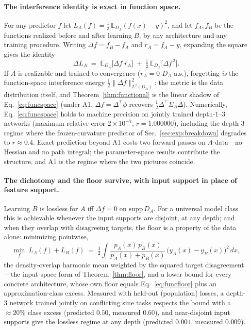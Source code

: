 \documentclass[10pt,a4paper]{article}
\theoremstyle{plain}
\theoremstyle{definition}
\newcommand{\Sig}{\Sigma}
\newcommand{\Del}{\Delta}
\begin{document}
\paragraph{The interference identity is exact in function space.} For any predictor $f$
let $L_A(f)=\tfrac12\,\mathbb{E}_{D_A}(f(x)-y)^2$, and let $f_A,f_B$ be the functions
realized before and after learning $B$, by any architecture and any training procedure.
Writing $\Delta\!f=f_B-f_A$ and $r_A=f_A-y$, expanding the square gives the identity
\begin{equation}
\Delta L_A\;=\;\mathbb{E}_{D_A}\!\big[\Delta\!f\;r_A\big]\;+\;\tfrac12\,
\mathbb{E}_{D_A}\!\big[\Delta\!f^{\,2}\big].
\label{eq:funcspace}
\end{equation}
If $A$ is realizable and trained to convergence ($r_A=0$ $D_A$-a.s.), forgetting \emph{is}
the function-space interference energy $\tfrac12\|\Delta\!f\|^2_{L^2(D_A)}$: the metric is
the data distribution itself, and Theorem~\ref{thm:functional} is the linear shadow of
Eq.~\eqref{eq:funcspace} (under A1, $\Delta\!f=\Del^\top\phi$ recovers
$\tfrac12\Del^\top\Sig_A\Del$). Numerically, Eq.~\eqref{eq:funcspace} holds to machine
precision on jointly trained depth-$1$--$3$ networks (maximum relative error
$2\times10^{-7}$, $r=1.000000$), including the depth-$3$ regime where the frozen-curvature
predictor of Sec.~\ref{sec:exp:breakdown} degrades to $r\approx0.4$. Exact prediction
beyond A1 costs two forward passes on $A$-data---no Hessian and no path integral; the
parameter-space results contribute the structure, and A1 is the regime where the two
pictures coincide.

\paragraph{The dichotomy and the floor survive, with input support in place of feature
support.} Learning $B$ is lossless for $A$ iff $\Delta\!f=0$ on
$\mathrm{supp}\,D_A$. For a universal model class this is achievable whenever the input
supports are disjoint, at any depth; and when they overlap with disagreeing targets, the
floor is a property of the data alone: minimizing pointwise,
\begin{equation}
\min_f\;L_A(f)+L_B(f)\;=\;\tfrac12\!\int\!
\frac{p_A(x)\,p_B(x)}{p_A(x)+p_B(x)}\,\big(y_A(x)-y_B(x)\big)^2\,dx,
\label{eq:funcfloor}
\end{equation}
the density-overlap harmonic mean weighted by the squared target disagreement---the
input-space form of Theorem~\ref{thm:floor}, and a lower bound for every concrete
architecture, whose own floor equals Eq.~\eqref{eq:funcfloor} plus an approximation-class
excess. Measured with held-out (population) losses, a depth-$3$ network trained jointly on
conflicting sine tasks respects the bound with a $\approx20\%$ class excess (predicted
$0.50$, measured $0.60$), and near-disjoint input supports give the lossless regime at any
depth (predicted $0.001$, measured $0.009$).
\end{document}

